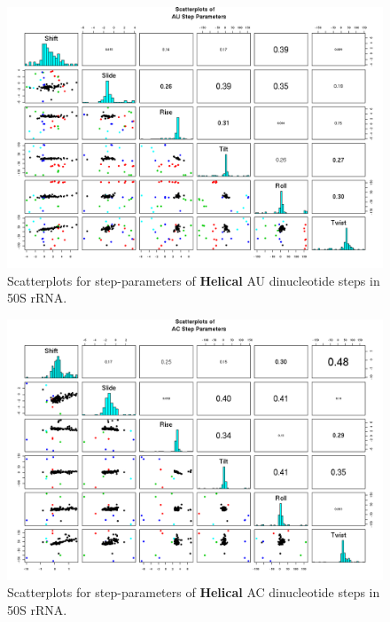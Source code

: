 \begin{figure}[H]
\centering
\includegraphics[angle=90, scale=0.6]{Helical/AU.png}
\caption{Scatterplots for step-parameters of \textbf{Helical} AU dinucleotide steps
in 50S rRNA.}
\label{fig:stepsAU}
\end{figure}

\begin{figure}[H]
\centering
\includegraphics[angle=90, scale=0.6]{Helical/AC.png}
\caption{Scatterplots for step-parameters of \textbf{Helical} AC dinucleotide steps
in 50S rRNA.}
\label{fig:stepsAC}
\end{figure}


